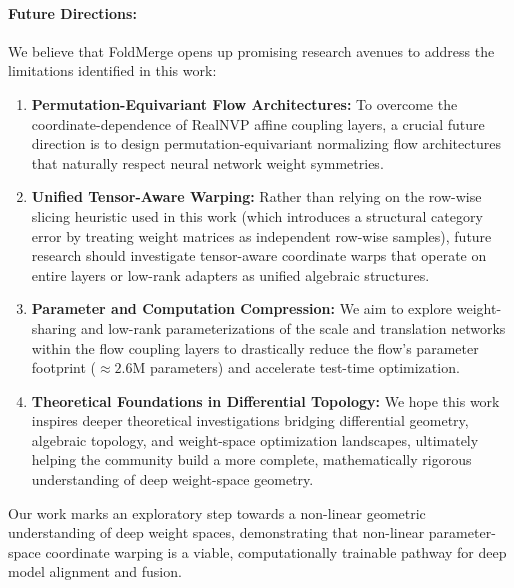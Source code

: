 \paragraph{Future Directions:}
We believe that FoldMerge opens up promising research avenues to address the limitations identified in this work:
\begin{enumerate}
  \item \textbf{Permutation-Equivariant Flow Architectures:} To overcome the coordinate-dependence of RealNVP affine coupling layers, a crucial future direction is to design permutation-equivariant normalizing flow architectures that naturally respect neural network weight symmetries.
  \item \textbf{Unified Tensor-Aware Warping:} Rather than relying on the row-wise slicing heuristic used in this work (which introduces a structural category error by treating weight matrices as independent row-wise samples), future research should investigate tensor-aware coordinate warps that operate on entire layers or low-rank adapters as unified algebraic structures.
  \item \textbf{Parameter and Computation Compression:} We aim to explore weight-sharing and low-rank parameterizations of the scale and translation networks within the flow coupling layers to drastically reduce the flow's parameter footprint ($\approx 2.6\text{M}$ parameters) and accelerate test-time optimization.
  \item \textbf{Theoretical Foundations in Differential Topology:} We hope this work inspires deeper theoretical investigations bridging differential geometry, algebraic topology, and weight-space optimization landscapes, ultimately helping the community build a more complete, mathematically rigorous understanding of deep weight-space geometry.
\end{enumerate}
Our work marks an exploratory step towards a non-linear geometric understanding of deep weight spaces, demonstrating that non-linear parameter-space coordinate warping is a viable, computationally trainable pathway for deep model alignment and fusion.
